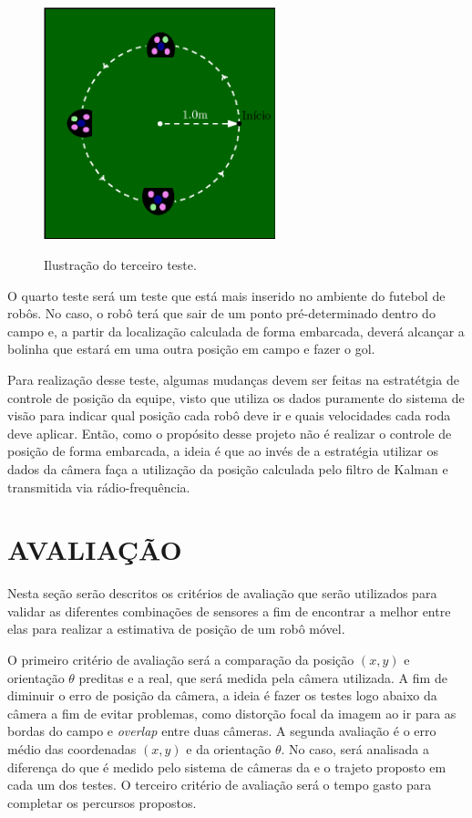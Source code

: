 \documentclass[acronym, symbols, table]{fei}
\begin{document}
		\begin{figure}[!htb]
			\centering
			\caption{Ilustração do terceiro teste.}
			\includegraphics[width=0.6\textwidth]{teste_3.eps}
			\label{fig:metodologia_teste_3}
		\end{figure}
		
		O quarto teste será um teste que está mais inserido no ambiente do futebol de robôs. No caso, o robô terá que sair de um ponto pré-determinado dentro do campo e, a partir da localização calculada de forma embarcada, deverá alcançar a bolinha que estará em uma outra posição em campo e fazer o gol.
		
		Para realização desse teste, algumas mudanças devem ser feitas na estratétgia de controle de posição da equipe, visto que utiliza os dados puramente do sistema de visão para indicar qual posição cada robô deve ir e quais velocidades cada roda deve aplicar. Então, como o propósito desse projeto não é realizar o controle de posição de forma embarcada, a ideia é que ao invés de a estratégia utilizar os dados da câmera faça a utilização da posição calculada pelo filtro de Kalman e transmitida via rádio-frequência.
		
	\section{AVALIAÇÃO}\label{sec:metodologia_avaliacao}
	
		Nesta seção serão descritos os critérios de avaliação que serão utilizados para validar as diferentes combinações de sensores a fim de encontrar a melhor entre elas para realizar a estimativa de posição de um robô móvel.
		
		O primeiro critério de avaliação será a comparação da posição $(x, y)$ e orientação $\theta$ preditas e a real, que será medida pela câmera utilizada. A fim de diminuir o erro de posição da câmera, a ideia é fazer os testes logo abaixo da câmera a fim de evitar problemas, como distorção focal da imagem ao ir para as bordas do campo e \textit{overlap} entre duas câmeras. A segunda avaliação é o erro médio das coordenadas $(x ,y)$ e da orientação $\theta$. No caso, será analisada a diferença do que é medido pelo sistema de câmeras da  e o trajeto proposto em cada um dos testes. O terceiro critério de avaliação será o tempo gasto para completar os percursos propostos.
		
\end{document}
